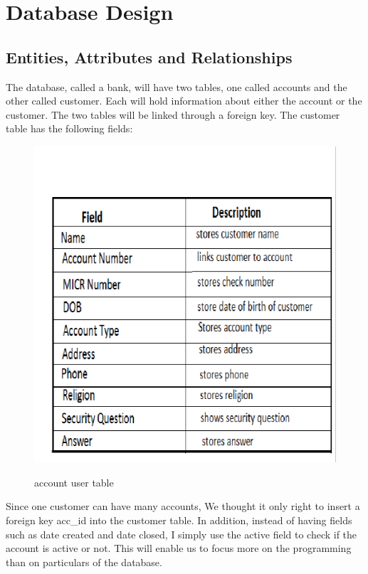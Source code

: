 \chapter{Database Design}

\section{Entities, Attributes and Relationships}
The database, called a bank, will have two tables, one called accounts and the other called
customer. Each will hold information about either the account or the customer. The two
tables will be linked through a foreign key. The customer table has the following fields:\\
\begin{figure}[H]
\centering
\caption{account user table}
\includegraphics[scale=.5]{./accountUserTable.png}
\\[0.2in]
\label{fig:account user table}
\end{figure}
Since one customer can have many accounts, We thought it only right to insert a foreign key
acc\_id into the customer table. In addition, instead of having fields such as date created and
date closed, I simply use the active field to check if the account is active or not. This will
enable us to focus more on the programming than on particulars of the database.\\
\thispagestyle{fancy}

